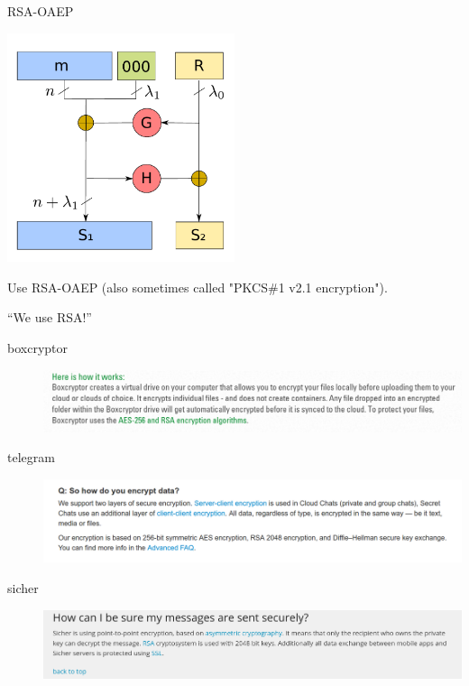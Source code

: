 \documentclass[presentation,smaller]{beamer}
\begin{document}
\begin{frame}[label={sec:orgdef03c8}]{RSA-OAEP}
\begin{center}
\begin{center}
\includegraphics[width=0.5\textwidth]{./rsa-oaep.pdf}
\end{center}
\end{center}

Use RSA-OAEP (also sometimes called "PKCS\#1 v2.1 encryption").
\end{frame}

\begin{frame}[label={sec:orgea0b0c7}]{“We use RSA!”}
\begin{description}
\item[{boxcryptor}] \begin{center}
\includegraphics[width=.9\linewidth]{./boxcryptor.png}
\end{center}
\item[{telegram}] \begin{center}
\includegraphics[width=.9\linewidth]{./telegram.png}
\end{center}
\item[{sicher}] \begin{center}
\includegraphics[width=.9\linewidth]{./sicher.png}
\end{center}
\end{description}
\end{frame}
\end{document}
